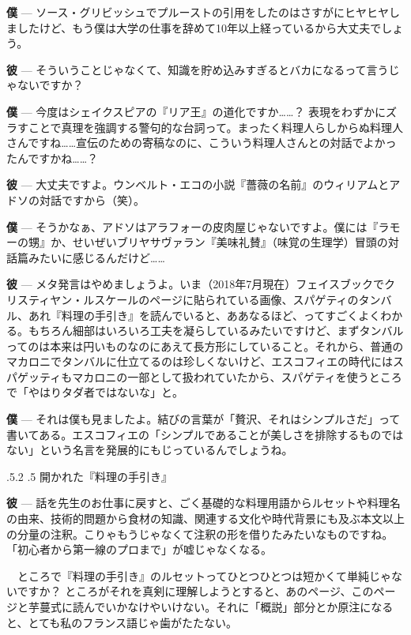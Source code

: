 \documentclass[14Q,]{ltjsbook}
\makeatletter
\renewcommand{\headfont}{\gtfamily\sffamily\bfseries}%
\renewcommand{\subsection}{\@startsection{subsection}{2}{\z@}%
    {\Cvs \@plus.5\Cdp \@minus.2\Cdp}%
    {.5\Cvs}
    {\normalfont\large\headfont\centering}} %
\renewcommand{\ldots}{\noindent…}
\makeatother
\begin{document}
\textbf{僕} ---
ソース・グリビッシュでプルーストの引用をしたのはさすがにヒヤヒヤしましたけど、もう僕は大学の仕事を辞めて10年以上経っているから大丈夫でしょう。

\textbf{彼} ---
そういうことじゃなくて、知識を貯め込みすぎるとバカになるって言うじゃないですか？

\textbf{僕} ---
今度はシェイクスピアの『リア王』の道化ですか\ldots{}\ldots{}？
表現をわずかにズラすことで真理を強調する警句的な台詞って。まったく料理人らしからぬ料理人さんですね\ldots{}\ldots{}宣伝のための寄稿なのに、こういう料理人さんとの対話でよかったんですかね\ldots{}\ldots{}？

\textbf{彼} ---
大丈夫ですよ。ウンベルト・エコの小説『薔薇の名前』のウィリアムとアドソの対話ですから（笑）。

\textbf{僕} ---
そうかなぁ、アドソはアラフォーの皮肉屋じゃないですよ。僕には『ラモーの甥』か、せいぜいブリヤサヴァラン『美味礼賛』（味覚の生理学）冒頭の対話篇みたいに感じるんだけど\ldots{}\ldots{}

\textbf{彼} ---
メタ発言はやめましょうよ。いま（2018年7月現在）フェイスブックでクリスティヤン・ルスケールのページに貼られている画像、スパゲティのタンバル、あれ『料理の手引き』を読んでいると、ああなるほど、ってすごくよくわかる。もちろん細部はいろいろ工夫を凝らしているみたいですけど、まずタンバルってのは本来は円いものなのにあえて長方形にしていること。それから、普通のマカロニでタンバルに仕立てるのは珍しくないけど、エスコフィエの時代にはスパゲッティもマカロニの一部として扱われていたから、スパゲティを使うところで「やはりタダ者ではないな」と。

\textbf{僕} ---
それは僕も見ましたよ。結びの言葉が「贅沢、それはシンプルさだ」って書いてある。エスコフィエの「シンプルであることが美しさを排除するものではない」という名言を発展的にもじっているんでしょうね。

\hypertarget{lgc-aperto}{%
\subsection{開かれた『料理の手引き』}\label{lgc-aperto}}

\textbf{彼} ---
話を先生のお仕事に戻すと、ごく基礎的な料理用語からルセットや料理名の由来、技術的問題から食材の知識、関連する文化や時代背景にも及ぶ本文以上の分量の注釈。こりゃもうじゃなくて注釈の形を借りたみたいなものですね。「初心者から第一線のプロまで」が嘘じゃなくなる。

　ところで『料理の手引き』のルセットってひとつひとつは短かくて単純じゃないですか？
ところがそれを真剣に理解しようとすると、あのページ、このページと芋蔓式に読んでいかなけやいけない。それに「概説」部分とか原注になると、とても私のフランス語じゃ歯がたたない。
\end{document}
